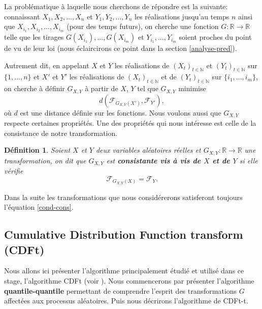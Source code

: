 \documentclass[a4paper,11pt]{article}
\numberwithin{equation}{section}
\newtheorem{definition}{Définition}
\begin{document}
La problématique à laquelle nous cherchons de répondre est la suivante: connaissant $X_1,X_2,...,X_n$ et $Y_1,Y_2,...,Y_n$ les réalisations jusqu'au temps $n$ ainsi que $X_{i_1},X_{i_2},...,X_{i_m}$ (pour des temps futurs), on cherche une fonction $G: \mathbb{R} \to \mathbb{R}$ telle que les tirages $G(X_{i_1}),..., G(X_{i_m})$ et $Y_{i_1},...,Y_{i_m}$ soient proches du point de vu de leur loi (nous éclaircirons ce point dans la section \ref{analyse-pred}). 

Autrement dit, en appelant $X$ et $Y$ les réalisations de $(X_t)_{t \in \mathbb{N}}$ et $(Y_t)_{t \in \mathbb{N}}$ sur $\{1,...,n\}$ et $X'$ et $Y'$ les réalisations de $(X_t)_{t \in \mathbb{N}}$ et de $(Y_t)_{t \in \mathbb{N}}$ sur $\{i_1,...,i_m\}$, on cherche à définir $G_{X,Y}$ à partir de $X$, $Y$ tel que $G_{X,Y}$ minimise 
\[d(\mathcal{F}_{G_{X,Y}(X')}, \mathcal{F}_{Y'}),\]
où $d$ est une distance définie sur les fonctions.
Nous voulons aussi que $G_{X,Y}$ respecte certaines propriétés. Une des propriétés qui nous intéresse est celle de la consistance de notre transformation.

\begin{definition}
	Soient $X$ et $Y$ deux variables aléatoires réelles et $G_{X,Y}: \mathbb{R}\to \mathbb{R}$ une transformation, on dit que $G_{X,Y}$ est \textbf{consistante vis à vis de $X$ et de $Y$} si elle vérifie 
	\begin{equation}
		\label{cond-cons}
		{\mathcal{F}_{G_{X,Y}(X)}}= \mathcal{F}_{Y}.
	\end{equation}
\end{definition}
Dans la suite les transformations que nous considérerons satisferont toujours l'équation \eqref{cond-cons}.

\subsection{Cumulative Distribution Function transform (CDFt)}
\label{ch:CDFt}

Nous allons ici présenter l'algorithme principalement étudié et utilisé dans ce stage, l'algorithme CDFt (voir \cite{vrac2012dynamical}). Nous commencerons par présenter l'algorithme \textbf{quantile-quantile} permettant de comprendre l'esprit des transformations $G$ affectées aux processus aléatoires. Puis nous décrirons l'algorithme de CDFt-t. 
\end{document}
